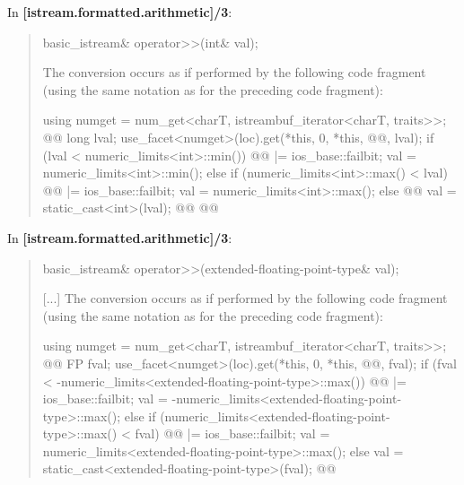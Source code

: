 \documentclass{wg21}
\begin{document}
In \textbf{[istream.formatted.arithmetic]/3}:
\begin{quote}
\begin{codeblock}
basic_istream& operator>>(int& val);
\end{codeblock}
The conversion occurs as if performed by the following code fragment (using the
same notation as for the preceding code fragment):
\begin{codeblock}
  using numget = num_get<charT, istreambuf_iterator<charT, traits>>;
  @@
  long lval;
  use_facet<numget>(loc).get(*this, 0, *this, @@, lval);
  if (lval < numeric_limits<int>::min()) {
    @@ |= ios_base::failbit;
    val = numeric_limits<int>::min();
  } else if (numeric_limits<int>::max() < lval) {
    @@ |= ios_base::failbit;
    val = numeric_limits<int>::max();
  }  else @\added{\{}@
    val = static_cast<int>(lval);
  @\added{\}}@
  @@
\end{codeblock}
\end{quote}

In \textbf{[istream.formatted.arithmetic]/3}:
\begin{quote}
\begin{codeblock}
basic_istream& operator>>(extended-floating-point-type& val);
\end{codeblock}
[...]
The conversion occurs as if performed by the following code fragment (using the
same notation as for the preceding code fragment):
\begin{codeblock}
  using numget = num_get<charT, istreambuf_iterator<charT, traits>>;
  @@
  FP fval;
  use_facet<numget>(loc).get(*this, 0, *this, @@, fval);
  if (fval < -numeric_limits<extended-floating-point-type>::max()) {
    @@ |= ios_base::failbit;
    val = -numeric_limits<extended-floating-point-type>::max();
  } else if (numeric_limits<extended-floating-point-type>::max() < fval) {
    @@ |= ios_base::failbit;
    val = numeric_limits<extended-floating-point-type>::max();
  } else {
    val = static_cast<extended-floating-point-type>(fval);
  }
  @@
\end{codeblock}
\end{quote}
\end{document}
